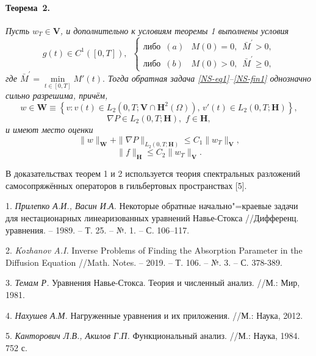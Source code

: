 \paragraph{Теорема~2.} {\it
Пусть $w_T\in\mathbf{V}$, и дополнительно к условиям теоремы 1 выполнены условия
\begin{equation}\label{NS-cond1}
g(t)\in C^1([0,T]),\,\,\,\left\{\begin{array}{ll}
                         \textrm{либо}\,\,\, (a)&M(0)=0,\,\,\, \bar{M}^{\prime}>0,\\
                         \textrm{либо}\,\,\, (b)&M(0)>0,\,\,\, \bar{M}^{\prime}\geq0,
                         \end{array}\right.
\end{equation}
где $\bar{M}^{\prime}=\min\limits_{t\in[0,T]}M'(t).$
Тогда обратная задача \eqref{NS-eq1}--\eqref{NS-fin1} однозначно сильно разрешима, причём,
$$
w\!\in\!\mathbf{W}\equiv \left\{v: v(t)\in L_2(0,T;\mathbf{V}\cap\mathbf{H}^2(\Omega)),\, v'(t)\in L_2(0,T;\mathbf{H})\right\}\!\!,
$$
$$
\nabla P\in L_2(0,T; \mathbf{H}),\,\, f\in \mathbf{H},
$$
и имеют место оценки
\begin{equation} \label{NS-est3}
\|w\|_{\mathbf{W}}+\|\nabla P\|_{L_2(0,T; \mathbf{H})}\leq C_1\|w_T\|_{\mathbf{V}},
\end{equation}
\begin{equation} \label{NS-est4}
\|f\|_{\mathbf{H}}\leq C_2\|w_T\|_{\mathbf{V}}.
\end{equation}
}

В доказательствах теорем 1 и 2 используется теория спектральных разложений самосопряжённых операторов в гильбертовых пространствах [5].


\litlist



1. {\it Прилепко А.И., Васин И.А.} Некоторые обратные начально"=краевые задачи для нестационарных линеаризованных уравнений Навье-Стокса //Дифференц. уравнения. – 1989. – Т. 25. – №. 1. – С. 106–117.

2. {\it Kozhanov A.I.} Inverse Problems of Finding the Absorption Parameter in the Diffusion Equation //Math. Notes. – 2019. – Т. 106. – №. 3. – С. 378-389.

3. {\it Темам Р.} Уравнения Навье-Стокса. Теория и численный анализ. //М.: Мир, 1981.

4. {\it Нахушев А.М.}  Нагруженные уравнения и их приложения. //М.: Наука, 2012.

5. {\it Канторович Л.В., Акилов Г.П.} Функциональный анализ. //М.: Наука, 1984. 752 с.
